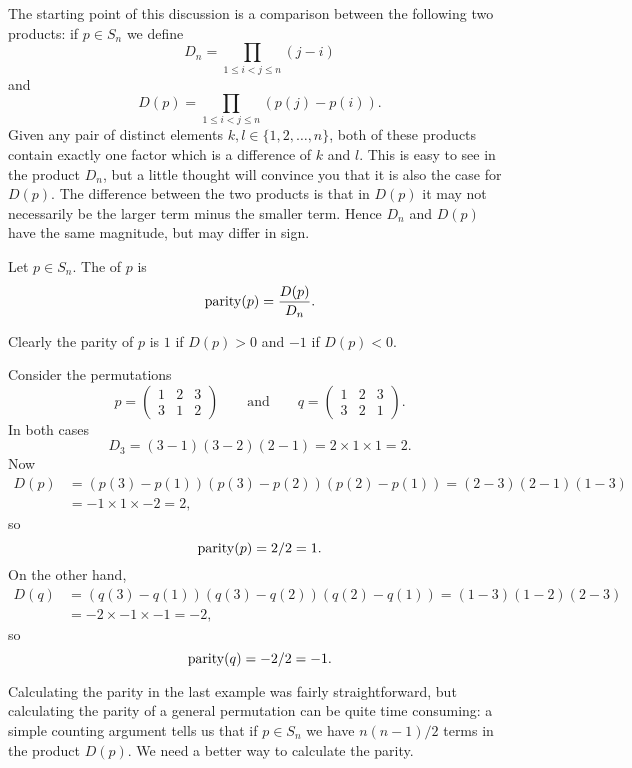 The starting point of this discussion is a comparison between the following
two products: if $p \in S_{n}$ we define
\[
  D_{n} = \prod_{1 \le i < j \le n} (j - i)
\]
and
\[
  D(p) = \prod_{1 \le i < j \le n} (p(j) - p(i)).
\]
Given any pair of distinct elements $k,l \in \{1, 2, \ldots, n\}$, both of
these products contain exactly one factor which is a difference of $k$ and $l$.
This is easy to see in the product $D_{n}$, but a little thought will convince
you that it is also the case for $D(p)$.  The difference between the two
products is that in $D(p)$ it may not necessarily be the larger term minus
the smaller term.  Hence $D_{n}$ and $D(p)$ have the same magnitude, but may differ
in sign.

\begin{definition}
  Let $p \in S_{n}$.  The  of $p$ is
  \[
    \operatorname{parity}(p) = \frac{D(p)}{D_{n}}.
  \]
\end{definition}

Clearly the parity of $p$ is $1$ if $D(p) > 0$ and $-1$ if $D(p) < 0$.

\begin{example}
  Consider the permutations
  \[
    p = \begin{pmatrix}
      1 & 2 & 3\\
      3 & 1 & 2
    \end{pmatrix}
    \qquad \text{and} \qquad
    q = \begin{pmatrix}
      1 & 2 & 3\\
      3 & 2 & 1
    \end{pmatrix}.
  \]
  In both cases
  \[
    D_{3} = (3 - 1)(3 - 2)(2 - 1) = 2 \times 1 \times 1 = 2.
  \]
  Now
  \begin{align*}
    D(p) &= (p(3) - p(1))(p(3) - p(2))(p(2) - p(1)) = (2 - 3)(2 - 1)(1 - 3) \\
      &= -1 \times 1 \times -2 = 2,
  \end{align*}
  so
  \[
    \operatorname{parity}(p) = 2/2 = 1.
  \]
  On the other hand,
  \begin{align*}
    D(q) &= (q(3) - q(1))(q(3) - q(2))(q(2) - q(1)) = (1 - 3)(1 - 2)(2 - 3)\\
      &= -2 \times -1 \times -1 = -2,
  \end{align*}
  so
  \[
    \operatorname{parity}(q) = -2/2 = -1.
  \]
\end{example}

Calculating the parity in the last example was fairly straightforward,
but calculating the parity of a general permutation can be quite time
consuming: a simple counting argument tells us that if $p \in S_{n}$ we
have $n(n-1)/2$ terms in the product $D(p)$.  We need a better way to
calculate the parity.

